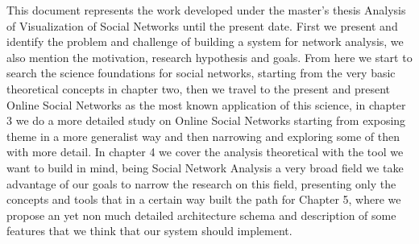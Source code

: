 This document represents the work developed under the master's thesis Analysis of Visualization of Social Networks until the present date.
First we present and identify the problem and challenge of building a system for network analysis, we also mention the motivation,
research hypothesis and goals. From here we start to search the science foundations for social networks, starting from the very basic theoretical
concepts in chapter two, then we travel to the present and present Online Social Networks as the most known application of this science, in chapter 3
we do a more detailed study on Online Social Networks starting from exposing theme in a more generalist way and then narrowing and exploring some of then with more detail. In chapter 4 we cover the analysis theoretical with the tool we want to build in mind, being Social Network Analysis a very broad field we take advantage of our goals to narrow the research on this field, presenting only the concepts and tools that in a certain way built the path for Chapter 5, where we propose an yet non much detailed architecture schema and description of some features that we think that our system should implement.
